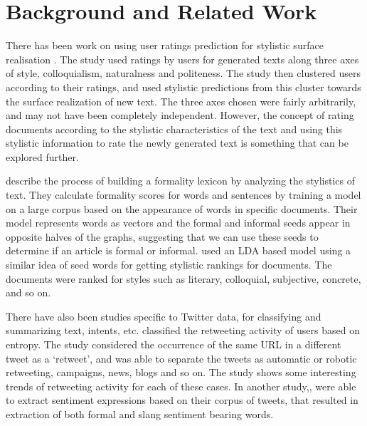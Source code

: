 \documentclass[11pt]{article}
\begin{document}
\section{Background and Related Work}

There has been work on using user ratings prediction for stylistic surface realisation . The study used ratings by users for generated texts along three axes of style, colloquialism, naturalness and politeness. The study then clustered users according to their ratings, and used stylistic predictions from this cluster towards the surface realization of new text. The three axes chosen were fairly arbitrarily, and may not have been completely independent. However, the concept of rating documents according to the stylistic characteristics of the text and using this stylistic information to rate the newly generated text is something that can be explored further. 

 describe the process of building a formality lexicon by analyzing the stylistics of text. They calculate formality scores for words and sentences by training a model on a large corpus based on the appearance of words in specific documents. Their model represents words as vectors and the formal and informal seeds appear in opposite halves of the graphs, suggesting that we can use these seeds to determine if an article is formal or informal.  used an LDA based model using a similar idea of seed words for getting stylistic rankings for documents. The documents were ranked for styles such as literary, colloquial, subjective, concrete, and so on. 

There have also been studies specific to Twitter data, for classifying and summarizing text, intents, etc.  classified the retweeting activity of users based on entropy. The study considered the occurrence of the same URL in a different tweet as a ‘retweet’, and was able to separate the tweets as automatic or robotic retweeting, campaigns, news, blogs and so on. The study shows some interesting trends of retweeting activity for each of these cases. In another study,, were able to extract sentiment expressions based on their corpus of tweets, that resulted in extraction of both formal and slang sentiment bearing words.
\end{document}
